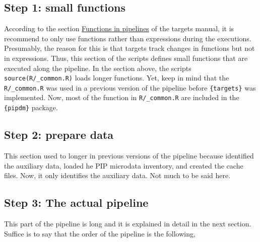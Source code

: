 \documentclass[
]{book}
\begin{document}
\hypertarget{step-1-small-functions}{%
\subsection*{Step 1: small functions}\label{step-1-small-functions}}

According to the section \href{https://books.ropensci.org/targets/functions.html\#functions-in-pipelines}{Functions in
pipelines}
of the targets manual, it is recommend to only use functions rather than
expressions during the executions. Presumably, the reason for this is that
targets track changes in functions but not in expressions. Thus, this section of
the scripts defines small functions that are executed along the pipeline. In the
section above, the scripts \texttt{source(\textquotesingle{}R/\_common.R\textquotesingle{})} loads longer functions. Yet,
keep in mind that the \texttt{\textquotesingle{}R/\_common.R\textquotesingle{}} was used in a previous version of the
pipeline before \texttt{\{targets\}} was implemented. Now, most of the function in
\texttt{\textquotesingle{}R/\_common.R\textquotesingle{}} are included in the \texttt{\{pipdm\}} package.

\hypertarget{step-2-prepare-data}{%
\subsection*{Step 2: prepare data}\label{step-2-prepare-data}}

This section used to longer in previous versions of the pipeline because
identified the auxiliary data, loaded he PIP microdata inventory, and created
the cache files. Now, it only identifies the auxiliary data. Not much to be said
here.

\hypertarget{step-3-the-actual-pipeline}{%
\subsection{Step 3: The actual pipeline}\label{step-3-the-actual-pipeline}}

This part of the pipeline is long and it is explained in detail in the next
section. Suffice is to say that the order of the pipeline is the following,
\end{document}
